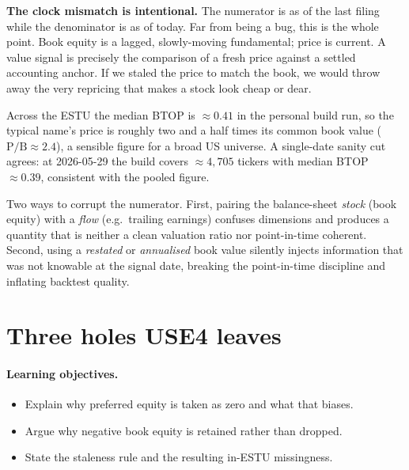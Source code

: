 \documentclass[11pt]{article}
\theoremstyle{definition}
\theoremstyle{plain}
\theoremstyle{remark}
\begin{document}
\textbf{The clock mismatch is intentional.} The numerator is as of the last filing while the denominator is as of today. Far from being a bug, this is the whole point. Book equity is a lagged, slowly-moving fundamental; price is current. A value signal is precisely the comparison of a fresh price against a settled accounting anchor. If we staled the price to match the book, we would throw away the very repricing that makes a stock look cheap or dear.

\begin{observed}
Across the ESTU the median BTOP is $\approx 0.41$ in the personal build run, so the typical name's price is roughly two and a half times its common book value ($\text{P/B}\approx 2.4$), a sensible figure for a broad US universe. A single-date sanity cut agrees: at 2026-05-29 the build covers $\approx 4{,}705$ tickers with median BTOP $\approx 0.39$, consistent with the pooled figure.
\end{observed}

\begin{pitfall}
Two ways to corrupt the numerator. First, pairing the balance-sheet \emph{stock} (book equity) with a \emph{flow} (e.g.\ trailing earnings) confuses dimensions and produces a quantity that is neither a clean valuation ratio nor point-in-time coherent. Second, using a \emph{restated} or \emph{annualised} book value silently injects information that was not knowable at the signal date, breaking the point-in-time discipline and inflating backtest quality.
\end{pitfall}

\section{Three holes USE4 leaves}\label{sec:holes}

\paragraph{Learning objectives.}
\begin{itemize}[leftmargin=1.4em,nosep]
  \item Explain why preferred equity is taken as zero and what that biases.
  \item Argue why negative book equity is retained rather than dropped.
  \item State the staleness rule and the resulting in-ESTU missingness.
\end{itemize}
\end{document}
